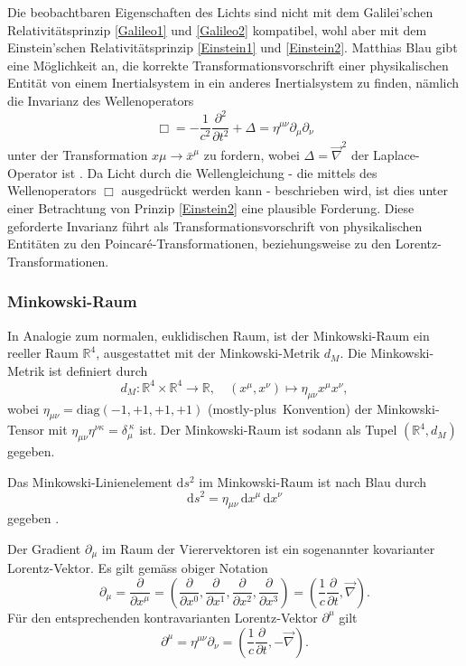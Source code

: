 \documentclass[a4paper,12pt]{article}
\numberwithin{equation}{section}
\begin{document}
Die beobachtbaren Eigenschaften des Lichts sind nicht mit dem Galilei'schen Relativitätsprinzip \ref{Galileo1} und \ref{Galileo2} kompatibel, wohl aber mit dem Einstein'schen Relativitätsprinzip \ref{Einstein1} und \ref{Einstein2}. Matthias Blau gibt eine Möglichkeit an, die korrekte Transformationsvorschrift einer physikalischen Entität von einem Inertialsystem in ein anderes Inertialsystem zu finden, nämlich die Invarianz des Wellenoperators \begin{equation}
\Box = -\frac{1}{c^2}\frac{\partial^2}{\partial t^2} + \Delta = \eta^{\mu\nu}\partial_\mu\partial_\nu
\end{equation} unter der Transformation $x\mu \rightarrow \bar{x}^\mu$ zu fordern, wobei $\Delta = \vec{\nabla}^2$ der Laplace-Operator ist \cite[S.7]{Blau.2021}. Da Licht durch die Wellengleichung - die mittels des Wellenoperators $\Box$ ausgedrückt werden kann - beschrieben wird, ist dies unter einer Betrachtung von Prinzip \ref{Einstein2} eine plausible Forderung. Diese geforderte Invarianz führt als Transformationsvorschrift von physikalischen Entitäten zu den Poincaré-Transformationen, beziehungsweise zu den Lorentz-Transformationen.

\subsubsection{Minkowski-Raum}
In Analogie zum normalen, euklidischen Raum, ist der Minkowski-Raum ein reeller Raum $\mathbb{R}^4$, ausgestattet mit der Minkowski-Metrik $d_M$. Die Minkowski-Metrik ist definiert durch \begin{equation}
d_M: \mathbb{R}^4 \times \mathbb{R}^4 \rightarrow \mathbb{R}, \quad (x^\mu,x^\nu) \mapsto \eta_{\mu\nu}x^\mu x^\nu,
\end{equation} wobei $\eta_{\mu\nu} = \mathrm{diag}(-1,+1,+1,+1)$ (\flqq mostly-plus\frqq\ Konvention) der Minkowski-Tensor mit $\eta_{\mu\nu}\eta^{\nu\kappa} = \delta_\mu^{\ \kappa}$ ist. Der Minkowski-Raum ist sodann als Tupel $(\mathbb{R}^4,d_M)$ gegeben.

Das Minkowski-Linienelement $\mathrm{d}s^2$ im Minkowski-Raum ist nach Blau durch \begin{equation}
\mathrm{d}s^2 = \eta_{\mu\nu}\,\mathrm{d}x^\mu\,\mathrm{d}x^\nu
\end{equation} gegeben \cite[S.14]{Blau.2021}.

Der Gradient $\partial_\mu$ im Raum der Vierervektoren ist ein sogenannter kovarianter Lorentz-Vektor. Es gilt gemäss obiger Notation \begin{equation}\label{diffoplower}
\partial_\mu = \frac{\partial}{\partial x^\mu} = \left(\frac{\partial}{\partial x^0},\frac{\partial}{\partial x^1},\frac{\partial}{\partial x^2},\frac{\partial}{\partial x^3} \right) = \left(\frac{1}{c}\frac{\partial}{\partial t}, \vec{\nabla}\right).
\end{equation} Für den entsprechenden kontravarianten Lorentz-Vektor $\partial^\mu$ gilt \begin{equation}\label{diffopupper}
\partial^\mu = \eta^{\mu\nu}\partial_\nu = \left(\frac{1}{c}\frac{\partial}{\partial t},-\vec{\nabla}\right).
\end{equation}
\end{document}
